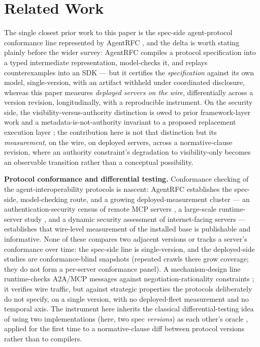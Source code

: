 \documentclass[11pt]{article}
\begin{document}
\section{Related Work}

The single closest prior work to this paper is the spec-side agent-protocol conformance line represented by AgentRFC \citep{agentrfc}, and the delta is worth stating plainly before the wider survey: AgentRFC compiles a protocol specification into a typed intermediate representation, model-checks it, and replays counterexamples into an SDK --- but it certifies the \emph{specification} against its own model, single-version, with an artifact withheld under coordinated disclosure, whereas this paper measures \emph{deployed servers on the wire}, differentially across a version revision, longitudinally, with a reproducible instrument. On the security side, the visibility-versus-authority distinction is owed to prior framework-layer work \citep{capgates} and a metadata-is-not-authority invariant to a proposed replacement execution layer \citep{hcp}; the contribution here is not that distinction but its \emph{measurement}, on the wire, on deployed servers, across a normative-clause revision, where an authority constraint's degradation to visibility-only becomes an observable transition rather than a conceptual possibility.

\textbf{Protocol conformance and differential testing.} Conformance checking of the agent-interoperability protocols is nascent: AgentRFC \citep{agentrfc} establishes the spec-side, model-checking route, and a growing deployed-measurement cluster --- an authentication-security census of remote MCP servers \citep{remotemcp}, a large-scale runtime-server study \citep{mcpzoo2026}, and a dynamic security assessment of internet-facing servers \citep{exposedbydesign2026} --- establishes that wire-level measurement of the installed base is publishable and informative. None of these compares two adjacent versions or tracks a server's conformance over time: the spec-side line is single-version, and the deployed-side studies are conformance-blind snapshots (repeated crawls there grow coverage; they do not form a per-server conformance panel). A mechanism-design line runtime-checks A2A/MCP messages against negotiation-rationality constraints \citep{negotiate2026}; it verifies wire traffic, but against strategic properties the protocols deliberately do not specify, on a single version, with no deployed-fleet measurement and no temporal axis. The instrument here inherits the classical differential-testing idea of using two implementations (here, two spec \emph{versions}) as each other's oracle \citep{mckeeman1998, yang2011csmith}, applied for the first time to a normative-clause diff between protocol versions rather than to compilers.
\end{document}
